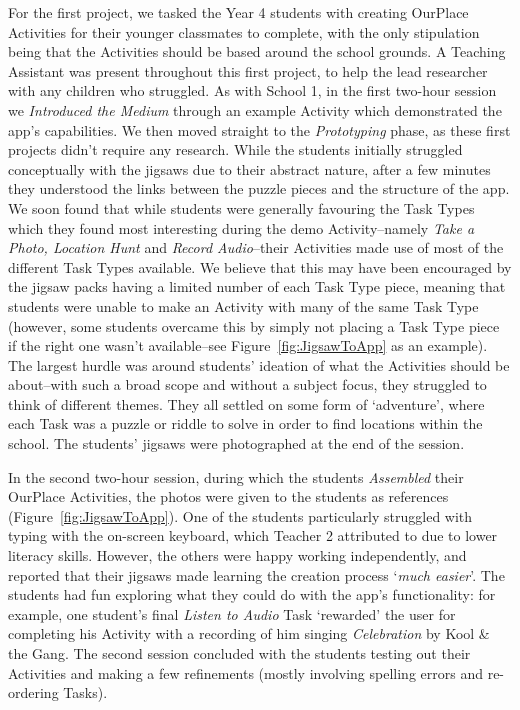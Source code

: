 \documentclass[,hyphens]{sigchi}
\begin{document}
For the first project, we tasked the Year 4 students with creating OurPlace Activities for their younger classmates to complete, with the only stipulation being that the Activities should be based around the school grounds. A Teaching Assistant was present throughout this first project, to help the lead researcher with any children who struggled. As with School 1, in the first two-hour session we \textit{Introduced the Medium} through an example Activity which demonstrated the app's capabilities. We then moved straight to the \textit{Prototyping} phase, as these first projects didn't require any research. While the students initially struggled conceptually with the jigsaws due to their abstract nature, after a few minutes they understood the links between the puzzle pieces and the structure of the app. We soon found that while students were generally favouring the Task Types which they found most interesting during the demo Activity--namely \textit{Take a Photo, Location Hunt} and \textit{Record Audio}--their Activities made use of most of the different Task Types available. We believe that this may have been encouraged by the jigsaw packs having a limited number of each Task Type piece, meaning that students were unable to make an Activity with many of the same Task Type (however, some students overcame this by simply not placing a Task Type piece if the right one wasn't available--see Figure~\ref{fig:JigsawToApp} as an example). The largest hurdle was around students' ideation of what the Activities should be about--with such a broad scope and without a subject focus, they struggled to think of different themes. They all settled on some form of `adventure', where each Task was a puzzle or riddle to solve in order to find locations within the school. The students' jigsaws were photographed at the end of the session.

In the second two-hour session, during which the students \textit{Assembled} their OurPlace Activities, the photos were given to the students as references   (Figure~\ref{fig:JigsawToApp}). One of the students particularly struggled with typing with the on-screen keyboard, which Teacher 2 attributed to due to lower literacy skills. However, the others were happy working independently, and reported that their jigsaws made learning the creation process `\textit{much easier}'. The students had fun exploring what they could do with the app's functionality: for example, one student's final \textit{Listen to Audio} Task `rewarded' the user for completing his Activity with a recording of him singing \textit{Celebration} by Kool \& the Gang. The second session concluded with the students testing out their Activities and making a few refinements (mostly involving spelling errors and re-ordering Tasks). 
\end{document}
